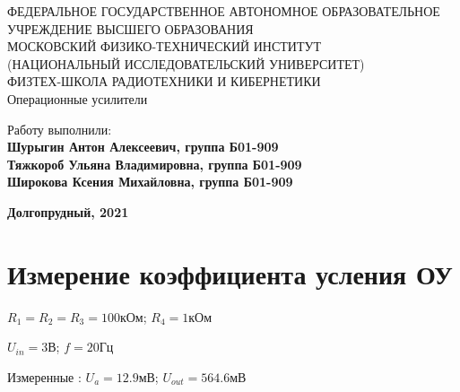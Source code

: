 \documentclass[15pt,a5paper,reqno]{article}
\begin{document}
\begin{center}
  {\small ФЕДЕРАЛЬНОЕ ГОСУДАРСТВЕННОЕ АВТОНОМНОЕ ОБРАЗОВАТЕЛЬНОЕ\\ УЧРЕЖДЕНИЕ ВЫСШЕГО ОБРАЗОВАНИЯ\\ МОСКОВСКИЙ ФИЗИКО-ТЕХНИЧЕСКИЙ ИНСТИТУТ\\ (НАЦИОНАЛЬНЫЙ ИССЛЕДОВАТЕЛЬСКИЙ УНИВЕРСИТЕТ)\\ ФИЗТЕХ-ШКОЛА РАДИОТЕХНИКИ И КИБЕРНЕТИКИ}\\
  \hfill \break
  \hfill \break
  \hfill \break
  \Huge{Операционные усилители}\\
\end{center}

\hfill \break
\hfill \break
\hfill \break
\hfill \break
\hfill \break
\hfill \break

\begin{flushright}
  \normalsize{Работу выполнили:}\\
  \normalsize{\textbf{Шурыгин Антон Алексеевич, группа Б01-909 \\
                      Тяжкороб Ульяна Владимировна, группа Б01-909   \\   
                      Широкова Ксения Михайловна, группа Б01-909}}\\
\end{flushright}

\begin{center}
  \normalsize{\textbf{Долгопрудный, 2021}}
\end{center}


\thispagestyle{empty} %


\newpage
\thispagestyle{plain}
\tableofcontents
\thispagestyle{plain}
\newpage


\section{Измерение коэффициента усления ОУ}

    $R_1 = R_2 = R_3 = 100$кОм;
    $R_4 = 1$кОм

    \vspace{0,3cm}

    $U_{in} = 3$В;
    $f = 20$Гц

    \vspace{0,3cm}

    Измеренные : $U_a = 12.9$мВ; $U_{out} = 564.6$мВ
\end{document}

